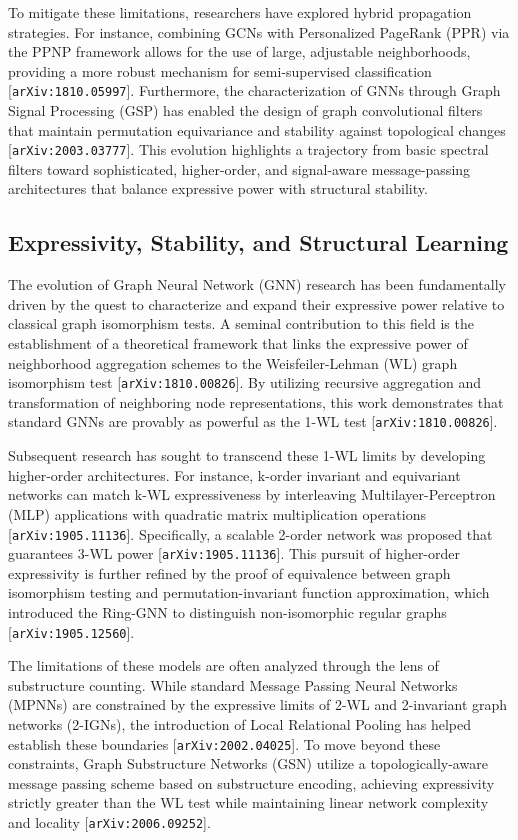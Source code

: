 \documentclass[11pt]{article}
\begin{document}
To mitigate these limitations, researchers have explored hybrid propagation strategies. For instance, combining GCNs with Personalized PageRank (PPR) via the PPNP framework allows for the use of large, adjustable neighborhoods, providing a more robust mechanism for semi-supervised classification [\texttt{arXiv:1810.05997}]. Furthermore, the characterization of GNNs through Graph Signal Processing (GSP) has enabled the design of graph convolutional filters that maintain permutation equivariance and stability against topological changes [\texttt{arXiv:2003.03777}]. This evolution highlights a trajectory from basic spectral filters toward sophisticated, higher-order, and signal-aware message-passing architectures that balance expressive power with structural stability.

\subsection{Expressivity, Stability, and Structural Learning}

The evolution of Graph Neural Network (GNN) research has been fundamentally driven by the quest to characterize and expand their expressive power relative to classical graph isomorphism tests. A seminal contribution to this field is the establishment of a theoretical framework that links the expressive power of neighborhood aggregation schemes to the Weisfeiler-Lehman (WL) graph isomorphism test [\texttt{arXiv:1810.00826}]. By utilizing recursive aggregation and transformation of neighboring node representations, this work demonstrates that standard GNNs are provably as powerful as the 1-WL test [\texttt{arXiv:1810.00826}].

Subsequent research has sought to transcend these 1-WL limits by developing higher-order architectures. For instance, k-order invariant and equivariant networks can match k-WL expressiveness by interleaving Multilayer-Perceptron (MLP) applications with quadratic matrix multiplication operations [\texttt{arXiv:1905.11136}]. Specifically, a scalable 2-order network was proposed that guarantees 3-WL power [\texttt{arXiv:1905.11136}]. This pursuit of higher-order expressivity is further refined by the proof of equivalence between graph isomorphism testing and permutation-invariant function approximation, which introduced the Ring-GNN to distinguish non-isomorphic regular graphs [\texttt{arXiv:1905.12560}].

The limitations of these models are often analyzed through the lens of substructure counting. While standard Message Passing Neural Networks (MPNNs) are constrained by the expressive limits of 2-WL and 2-invariant graph networks (2-IGNs), the introduction of Local Relational Pooling has helped establish these boundaries [\texttt{arXiv:2002.04025}]. To move beyond these constraints, Graph Substructure Networks (GSN) utilize a topologically-aware message passing scheme based on substructure encoding, achieving expressivity strictly greater than the WL test while maintaining linear network complexity and locality [\texttt{arXiv:2006.09252}].
\end{document}
